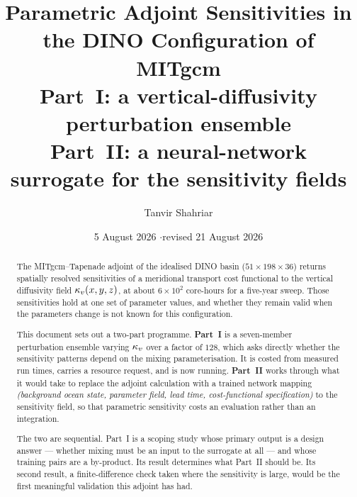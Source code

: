\title{\bfseries Parametric Adjoint Sensitivities in the DINO
       Configuration of MITgcm\\[0.45em]
       \large Part~I: a vertical-diffusivity perturbation ensemble\\
       Part~II: a neural-network surrogate for the sensitivity fields}
\author{Tanvir Shahriar}
\date{5 August 2026 \quad$\cdot$\quad revised 21 August 2026}
\maketitle

\begin{abstract}
\noindent
The MITgcm--Tapenade adjoint of the idealised DINO basin
($51\times198\times36$) returns spatially resolved sensitivities of a meridional
transport cost functional to the vertical diffusivity field $\kappa_{v}(x,y,z)$, at
about $6\times10^{2}$ core-hours for a five-year sweep. Those sensitivities hold
at one set of parameter values, and whether they remain valid when the
parameters change is not known for this configuration.

This document sets out a two-part programme. \textbf{Part~I} is a
seven-member perturbation ensemble varying $\kappa_{v}$ over a factor of $128$, which
asks directly whether the sensitivity patterns depend on the mixing
parameterisation. It is costed from measured run times, carries a resource
request, and is now running. \textbf{Part~II} works through what it would take
to replace the adjoint calculation with a trained network mapping
\emph{(background ocean state, parameter field, lead time, cost-functional
specification)} to the sensitivity field, so that parametric sensitivity costs
an evaluation rather than an integration.

The two are sequential. Part~I is a scoping study whose primary output is a
design answer --- whether mixing must be an input to the surrogate at all ---
and whose training pairs are a by-product. Its result determines what Part~II
should be. Its second result, a finite-difference check taken where the
sensitivity is large, would be the first meaningful validation this adjoint has
had.
\end{abstract}
